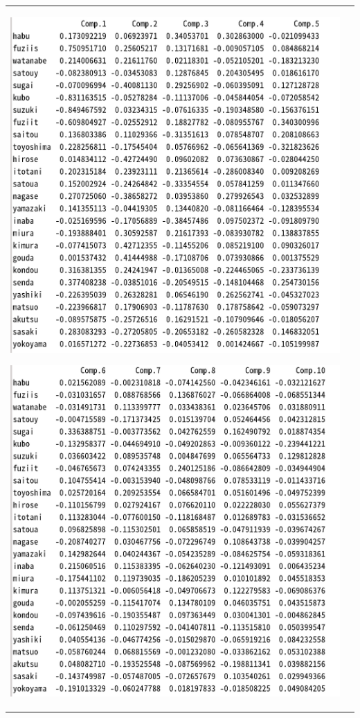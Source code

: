 \documentclass[11pt,a4paper,dvipdfmx]{jsarticle}
\begin{document}
\begin{tabular}{cc}
    \begin{minipage}[t]{0.47\hsize}
        \centering
        \includegraphics[width=1\textwidth]{graph/shogi-scores-1.jpg}
    \end{minipage}
    \begin{minipage}[t]{0.47\hsize}
        \centering
        \includegraphics[width=1\textwidth]{graph/shogi-scores-2.jpg}
    \end{minipage}
\end{tabular}
\end{document}
